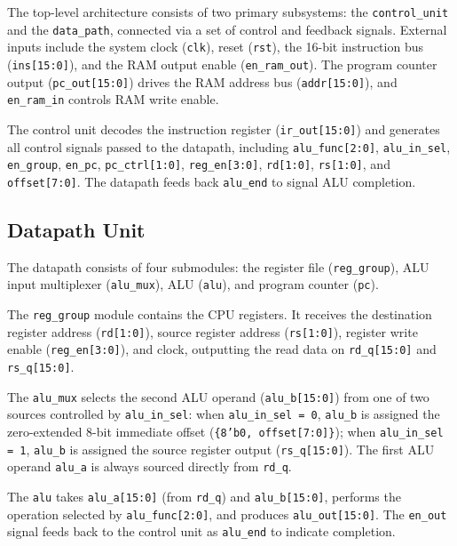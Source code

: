 \documentclass{article}
\begin{document}
The top-level architecture consists of two primary subsystems: the \texttt{control\_unit} and the \texttt{data\_path}, connected via a set of control and feedback signals. External inputs include the system clock (\texttt{clk}), reset (\texttt{rst}), the 16-bit instruction bus (\texttt{ins[15:0]}), and the RAM output enable (\texttt{en\_ram\_out}). The program counter output (\texttt{pc\_out[15:0]}) drives the RAM address bus (\texttt{addr[15:0]}), and \texttt{en\_ram\_in} controls RAM write enable.

The control unit decodes the instruction register (\texttt{ir\_out[15:0]}) and generates all control signals passed to the datapath, including \texttt{alu\_func[2:0]}, \texttt{alu\_in\_sel}, \texttt{en\_group}, \texttt{en\_pc}, \texttt{pc\_ctrl[1:0]}, \texttt{reg\_en[3:0]}, \texttt{rd[1:0]}, \texttt{rs[1:0]}, and \texttt{offset[7:0]}. The datapath feeds back \texttt{alu\_end} to signal ALU completion.

\subsection{Datapath Unit}

The datapath consists of four submodules: the register file (\texttt{reg\_group}), ALU input multiplexer (\texttt{alu\_mux}), ALU (\texttt{alu}), and program counter (\texttt{pc}).

The \texttt{reg\_group} module contains the CPU registers. It receives the destination register address (\texttt{rd[1:0]}), source register address (\texttt{rs[1:0]}), register write enable (\texttt{reg\_en[3:0]}), and clock, outputting the read data on \texttt{rd\_q[15:0]} and \texttt{rs\_q[15:0]}.

The \texttt{alu\_mux} selects the second ALU operand (\texttt{alu\_b[15:0]}) from one of two sources controlled by \texttt{alu\_in\_sel}: when \texttt{alu\_in\_sel = 0}, \texttt{alu\_b} is assigned the zero-extended 8-bit immediate offset (\texttt{\{8'b0, offset[7:0]\}}); when \texttt{alu\_in\_sel = 1}, \texttt{alu\_b} is assigned the source register output (\texttt{rs\_q[15:0]}). The first ALU operand \texttt{alu\_a} is always sourced directly from \texttt{rd\_q}.

The \texttt{alu} takes \texttt{alu\_a[15:0]} (from \texttt{rd\_q}) and \texttt{alu\_b[15:0]}, performs the operation selected by \texttt{alu\_func[2:0]}, and produces \texttt{alu\_out[15:0]}. The \texttt{en\_out} signal feeds back to the control unit as \texttt{alu\_end} to indicate completion.
\end{document}
